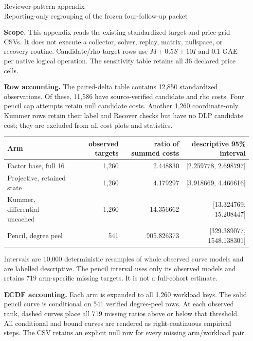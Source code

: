 \documentclass[10pt]{article}
\begin{document}
\sloppy
\begin{center}
{\Large Reviewer-pattern appendix}\\[3pt]
{\normalsize Reporting-only regrouping of the frozen four-follow-up packet}
\end{center}

\noindent\textbf{Scope.} This appendix reads the existing standardized target
and price-grid CSVs. It does not execute a collector, solver, replay, matrix,
nullspace, or recovery routine. Candidate/rho target rows use
$M+0.5S+10I$ and 0.1 GAE per native logical operation. The sensitivity table
retains all 36 declared price cells.

\par\medskip
\noindent\textbf{Row accounting.} The paired-delta table contains 12,850
standardized observations. Of these, 11,586 have source-verified candidate and
rho costs. Four pencil cap attempts retain null candidate costs. Another 1,260
coordinate-only Kummer rows retain their label and Recover checks but have no
DLP candidate cost; they are excluded from all cost plots and statistics.

\par\medskip
\begin{center}\small
\begin{tabular}{l|r|r|r}
Arm & observed targets & ratio of summed costs & descriptive 95\% interval\\\hline
Factor base, full 16 & 1,260 & 2.448830 & [2.259778, 2.698797]\\
Projective, retained state & 1,260 & 4.179297 & [3.918669, 4.466616]\\
Kummer, differential uncached & 1,260 & 14.356662 & [13.324769, 15.208447]\\
Pencil, degree peel & 541 & 905.826373 & [329.389077, 1548.138301]\\
\end{tabular}
\end{center}

\noindent Intervals are 10,000 deterministic resamples of whole observed
curve models and are labelled descriptive. The pencil interval uses only its
observed models and retains 719 arm-specific missing targets. It is not a
full-cohort estimate.

\par\medskip
\noindent\textbf{ECDF accounting.} Each arm is expanded to all 1,260 workload
keys. The solid pencil curve is conditional on 541 verified degree-peel rows.
At each observed rank, dashed curves place all 719 missing ratios above or
below that threshold. All conditional and bound curves are rendered as
right-continuous empirical steps. The CSV retains an explicit null row for
every missing arm/workload pair.
\end{document}
